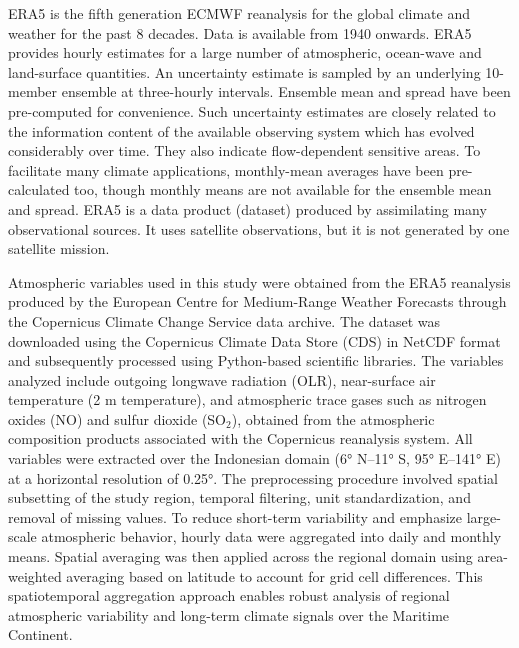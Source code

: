 \documentclass[pdflatex,sn-mathphys-num]{sn-jnl}%
\theoremstyle{thmstyleone}%
\theoremstyle{thmstyletwo}%
\theoremstyle{thmstylethree}%
\begin{document}
ERA5 is the fifth generation ECMWF reanalysis for the global climate and weather for the past 8 decades. Data is available from 1940 onwards. ERA5 provides hourly estimates for a large number of atmospheric, ocean-wave and land-surface quantities. An uncertainty estimate is sampled by an underlying 10-member ensemble at three-hourly intervals. Ensemble mean and spread have been pre-computed for convenience. Such uncertainty estimates are closely related to the information content of the available observing system which has evolved considerably over time. They also indicate flow-dependent sensitive areas. To facilitate many climate applications, monthly-mean averages have been pre-calculated too, though monthly means are not available for the ensemble mean and spread.
ERA5 is a data product (dataset) produced by assimilating many observational sources. It uses satellite observations, but it is not generated by one satellite mission.


Atmospheric variables used in this study were obtained from the ERA5 reanalysis produced by the European Centre for Medium-Range Weather Forecasts through the Copernicus Climate Change Service data archive. The dataset was downloaded using the Copernicus Climate Data Store (CDS) in NetCDF format and subsequently processed using Python-based scientific libraries. The variables analyzed include outgoing longwave radiation (OLR), near-surface air temperature (2 m temperature), and atmospheric trace gases such as nitrogen oxides (NO) and sulfur dioxide (SO$_2$), obtained from the atmospheric composition products associated with the Copernicus reanalysis system. All variables were extracted over the Indonesian domain (6° N–11° S, 95° E–141° E) at a horizontal resolution of 0.25°. The preprocessing procedure involved spatial subsetting of the study region, temporal filtering, unit standardization, and removal of missing values. To reduce short-term variability and emphasize large-scale atmospheric behavior, hourly data were aggregated into daily and monthly means. Spatial averaging was then applied across the regional domain using area-weighted averaging based on latitude to account for grid cell differences. This spatiotemporal aggregation approach enables robust analysis of regional atmospheric variability and long-term climate signals over the Maritime Continent.
\end{document}
